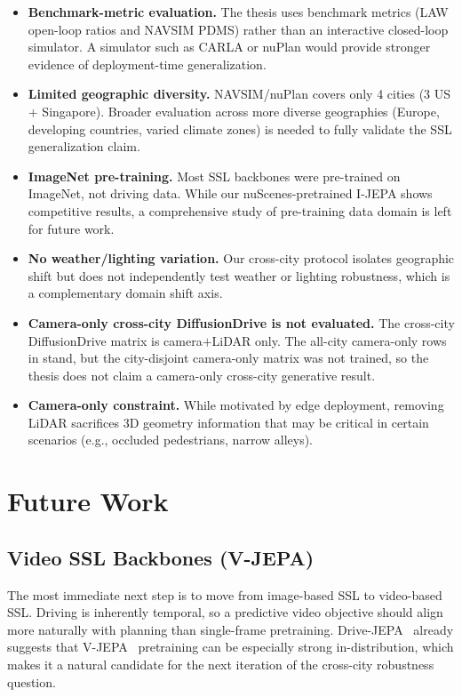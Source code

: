 \begin{itemize}
    \item \textbf{Benchmark-metric evaluation.} The thesis uses benchmark metrics (LAW open-loop ratios and NAVSIM PDMS) rather than an interactive closed-loop simulator. A simulator such as CARLA or nuPlan would provide stronger evidence of deployment-time generalization.

    \item \textbf{Limited geographic diversity.} NAVSIM/nuPlan covers only 4 cities (3 US + Singapore). Broader evaluation across more diverse geographies (Europe, developing countries, varied climate zones) is needed to fully validate the SSL generalization claim.

    \item \textbf{ImageNet pre-training.} Most SSL backbones were pre-trained on ImageNet, not driving data. While our nuScenes-pretrained I-JEPA shows competitive results, a comprehensive study of pre-training data domain is left for future work.

    \item \textbf{No weather/lighting variation.} Our cross-city protocol isolates geographic shift but does not independently test weather or lighting robustness, which is a complementary domain shift axis.

    \item \textbf{Camera-only cross-city DiffusionDrive is not evaluated.} The cross-city DiffusionDrive matrix is camera$+$LiDAR only. The all-city camera-only rows in  stand, but the city-disjoint camera-only matrix was not trained, so the thesis does not claim a camera-only cross-city generative result.

    \item \textbf{Camera-only constraint.} While motivated by edge deployment, removing LiDAR sacrifices 3D geometry information that may be critical in certain scenarios (e.g., occluded pedestrians, narrow alleys).
\end{itemize}

\section{Future Work}
\label{sec:concl-future}

\subsection{Video SSL Backbones (V-JEPA)}
The most immediate next step is to move from image-based SSL to video-based SSL. Driving is inherently temporal, so a predictive video objective should align more naturally with planning than single-frame pretraining. Drive-JEPA~\cite{wang-drive-jepa} already suggests that V-JEPA~\cite{bardes-vjepa-2024} pretraining can be especially strong in-distribution, which makes it a natural candidate for the next iteration of the cross-city robustness question.

